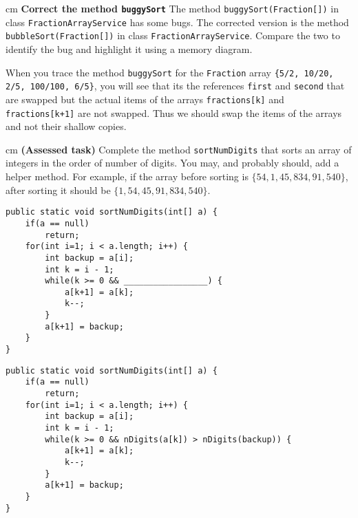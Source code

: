 \begin{questions}

 cm \question  \textbf{Correct the method \texttt{buggySort}} \vskip 0.5cm
The method \texttt{buggySort(Fraction[])} in class \texttt{FractionArrayService} 
has some bugs. The corrected version is the method \texttt{bubbleSort(Fraction[])} in class \texttt{FractionArrayService}. Compare the two to identify the bug and highlight it using a memory diagram.

\begin{solution}
When you trace the method \texttt{buggySort} for the \texttt{Fraction} array \texttt{\{5/2, 10/20, 2/5, 100/100, 6/5\}}, you will see that its the references \texttt{first} and \texttt{second} that are swapped but the actual items of the arrays \texttt{fractions[k]} and \texttt{fractions[k+1]} are not swapped. Thus we should swap the items of the arrays and not their shallow copies.
\end{solution}

 cm \question  \textbf{(Assessed task)} \vskip 0.5cm
Complete the method \texttt{sortNumDigits} that sorts an array of integers in the order of number of digits. You may, and probably should, add a helper method. For example, if the array before sorting is $\{54, 1, 45, 834, 91, 540\}$, after sorting it should be $\{1, 54, 45, 91, 834, 540\}$.

\begin{lstlisting}
public static void sortNumDigits(int[] a) {
	if(a == null) 
		return;
	for(int i=1; i < a.length; i++) {
		int backup = a[i];
		int k = i - 1;
		while(k >= 0 && _________________) {
			a[k+1] = a[k];
			k--;
		}
		a[k+1] = backup;
	}
}	
\end{lstlisting}

\begin{solution}
\begin{lstlisting}
public static void sortNumDigits(int[] a) {
	if(a == null) 
		return;
	for(int i=1; i < a.length; i++) {
		int backup = a[i];
		int k = i - 1;
		while(k >= 0 && nDigits(a[k]) > nDigits(backup)) {
			a[k+1] = a[k];
			k--;
		}
		a[k+1] = backup;
	}
}


\end{lstlisting}
\end{solution}
\end{questions}
